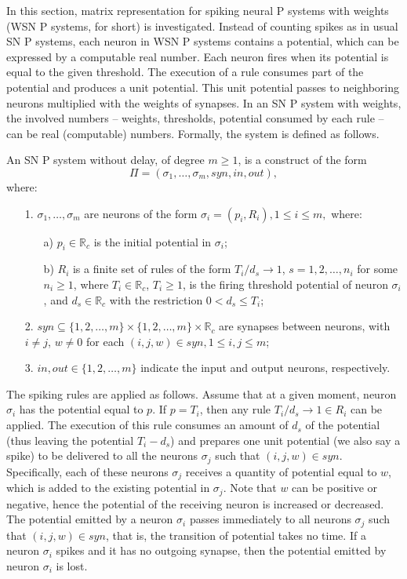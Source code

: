 \documentclass[runningheads]{llncs}
\begin{document}
In this section, matrix representation for spiking neural P systems
with weights (WSN P systems, for short) is investigated. Instead of
counting spikes as in usual SN P systems, each neuron in WSN P
systems contains a potential, which can be expressed by a computable
real number. Each neuron fires when its potential is equal to the
given threshold. The execution of a rule consumes part of the
potential and produces a unit potential. This unit potential passes
to neighboring neurons multiplied with the weights of synapses. In
an SN P system with weights, the involved numbers -- weights,
thresholds, potential consumed by each rule -- can be real
(computable) numbers. Formally, the system is defined as follows.

\begin{definition} An SN P system without delay, of degree $m\geq 1$,
is a construct of the form
$$\Pi=(\sigma_1,\ldots, \sigma_m, syn, in, out),$$
where:
\begin{enumerate}
\item[1.] $\sigma_1,\ldots, \sigma_m$ are neurons of the form
$\sigma_{i}=(p_i, R_i),1\leq i\leq m,$ where:
\begin{enumerate}
\item[a)] $p_i\in \mathbb{R}_c$ is the initial potential in $\sigma_i$;

\item[b)] $R_i$ is a finite set of rules of the form
$T_i/d_s \rightarrow 1$, $s=1,2,\dots,n_i$ for some $n_i\geq 1$,
where $T_i\in \mathbb{R}_c$, $T_i\geq 1$, is the firing threshold
potential of neuron $\sigma_i$, and $d_s\in \mathbb{R}_c$ with the
restriction $0<d_s\leq T_i$;
\end{enumerate}
\item[2.] $syn\subseteq \{1,2,\ldots,m\}\times \{1,2,\ldots,m\}\times
\mathbb{R}_c$ are synapses between neurons, with $i\neq j$, $w\neq
0$ for each $(i,j,w)\in syn, 1\leq i,j \leq m$;

\item[3.] $in, out\in \{1,2,\ldots, m\}$ indicate the input and output neurons, respectively.
\end{enumerate}

\end{definition}

The spiking rules are applied as follows. Assume that at a given
moment, neuron $\sigma_i$ has the potential equal to $p$. If $p =
T_i$, then any rule $T_i/d_s \rightarrow 1 \in R_i$ can be applied.
The execution of this rule consumes an amount of $d_s$ of the
potential (thus leaving the potential $T_i-d_s$) and prepares one
unit potential (we also say a spike) to be delivered to all the
neurons $\sigma_j$ such that $(i,j,w)\in syn$. Specifically, each of
these neurons $\sigma_j$ receives a quantity of potential equal to
$w$, which is added to the existing potential in $\sigma_j$. Note
that $w$ can be positive or negative, hence the potential of the
receiving neuron is increased or decreased. The potential emitted by
a neuron $\sigma_i$ passes immediately to all neurons $\sigma_j$
such that $(i,j,w)\in syn$, that is, the transition of potential
takes no time. If a neuron $\sigma_i$ spikes and it has no outgoing
synapse, then the potential emitted by neuron $\sigma_i$ is lost.
\end{document}
